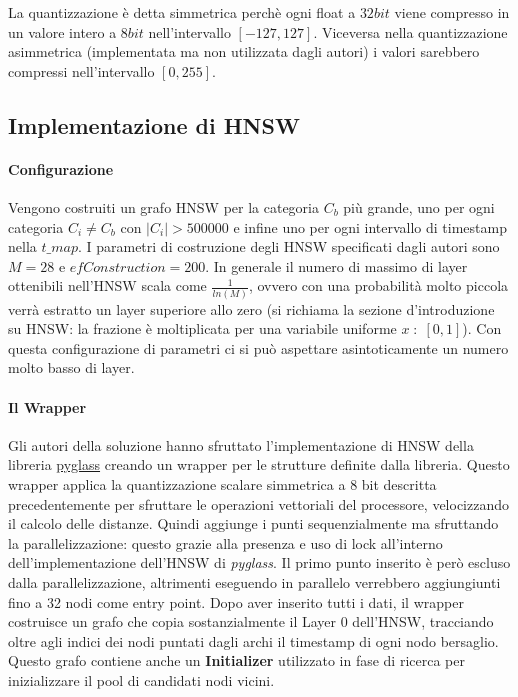 La quantizzazione \`e detta simmetrica perch\`e ogni float a $32bit$ viene compresso in un valore intero a $8bit$ nell'intervallo $[-127, 127]$.
Viceversa nella quantizzazione asimmetrica (implementata ma non utilizzata dagli autori) i valori sarebbero compressi nell'intervallo $[0, 255]$.

\subsection{Implementazione di HNSW}

\paragraph{Configurazione}

Vengono costruiti un grafo HNSW per la categoria $C_b$ pi\`u grande, uno per ogni categoria $C_i \ne C_b$ con $|C_i| > 500000$ e infine uno per ogni intervallo di timestamp nella $t\_map$.
I parametri di costruzione degli HNSW specificati dagli autori sono $M = 28$ e $efConstruction = 200$.
In generale il numero di massimo di layer ottenibili nell'HNSW scala come $\frac 1 {ln(M)}$, ovvero con una probabilit\`a
 molto piccola verr\`a estratto un layer superiore allo zero
 (si richiama la sezione d'introduzione su HNSW: la frazione \`e moltiplicata per una variabile uniforme $x \; : \; [0,1]$).
Con questa configurazione di parametri ci si pu\`o aspettare asintoticamente un numero molto basso di layer.

\paragraph{Il Wrapper}

Gli autori della soluzione hanno sfruttato l'implementazione di HNSW della libreria \href{https://github.com/zilliztech/pyglass/tree/master}{pyglass} creando un wrapper per le strutture definite dalla libreria.
Questo wrapper applica la quantizzazione scalare simmetrica a $8$ bit descritta precedentemente per sfruttare le operazioni vettoriali del processore, velocizzando il calcolo delle distanze.
Quindi aggiunge i punti sequenzialmente ma sfruttando la parallelizzazione: questo grazie alla presenza e uso di lock all'interno dell'implementazione dell'HNSW di \textit{pyglass}.
Il primo punto inserito \`e per\`o escluso dalla parallelizzazione, altrimenti eseguendo in parallelo verrebbero aggiungiunti fino a 32 nodi come entry point.
Dopo aver inserito tutti i dati, il wrapper costruisce un grafo che copia sostanzialmente il Layer 0 dell'HNSW, tracciando oltre agli indici dei nodi puntati dagli archi il timestamp di ogni nodo bersaglio.
Questo grafo contiene anche un \textbf{Initializer} utilizzato in fase di ricerca per inizializzare il pool di candidati nodi vicini.

